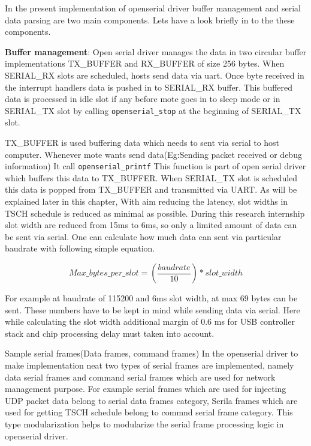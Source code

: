 In the present implementation of openserial driver buffer management and serial data parsing are two main components.
Lets have a look briefly in to the these components.

\textbf{Buffer management}: \newline
Open serial driver manages the data in two circular buffer implementations TX\_BUFFER and RX\_BUFFER of size 256 bytes. When SERIAL\_RX slots are scheduled, hosts send data via uart. Once byte received in the interrupt handlers data is pushed in to SERIAL\_RX buffer. This buffered data is processed in idle slot if any before mote goes in to sleep mode or in SERIAL\_TX slot by calling \texttt{openserial\_stop} at the beginning of SERIAL\_TX slot. 

TX\_BUFFER is used buffering data which needs to sent via serial to host computer. Whenever mote wants send data(Eg:Sending packet received or debug information) It call \texttt{openserial\_printf} This function is part  of open serial driver which buffers this data to TX\_BUFFER. When SERIAL\_TX slot is scheduled this data is popped from TX\_BUFFER and  transmitted via UART. As will be explained later in this chapter, With aim reducing the latency, slot widths in TSCH schedule is reduced as minimal as possible. During this research internship slot width are reduced from 15ms to 6ms, so only a limited amount of data can be sent via serial. One can calculate how much data can sent via particular baudrate with following simple equation.

\begin{equation}
Max\_bytes\_per\_slot = (\frac{baud rate}{10})*slot\_width
\end{equation}

For example at baudrate of 115200 and 6ms slot width, at max 69 bytes can be sent. These numbers have to be kept in mind while sending data via serial. Here while calculating the slot width additional margin of 0.6 ms for USB controller stack and chip processing delay must taken into account.

Sample serial frames(Data frames, command frames)
In the openserial driver to make implementation neat two types of serial frames are implemented, namely data serial frames and command serial frames which are used for network management purpose. For example serial frames which are used for injecting UDP packet data belong to serial data frames category, Serila frames which are used for getting TSCH schedule belong to commnd serial frame category. This type modularization helps to modularize the serial  frame processing logic in openserial driver.

